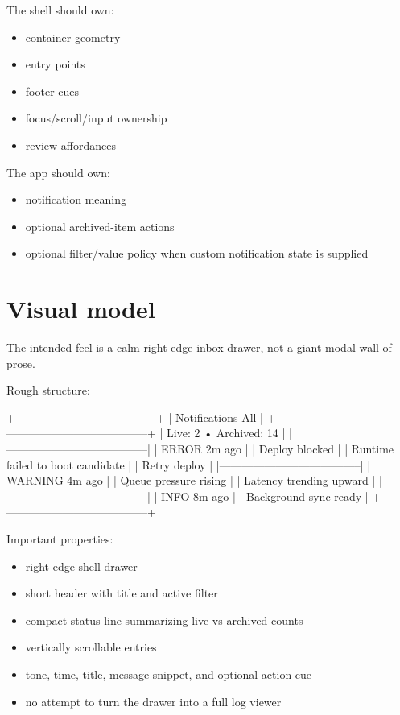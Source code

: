The shell should own:

\begin{itemize}
\tightlist
\item
  container geometry
\item
  entry points
\item
  footer cues
\item
  focus/scroll/input ownership
\item
  review affordances
\end{itemize}

The app should own:

\begin{itemize}
\tightlist
\item
  notification meaning
\item
  optional archived-item actions
\item
  optional filter/value policy when custom notification state is supplied
\end{itemize}

\section{Visual model}\label{record-053-visual-model}

The intended feel is a calm right-edge inbox drawer, not a giant modal wall of prose.

Rough structure:

\begin{CodeBlock}
+--------------------------------------+
| Notifications                   All |
+--------------------------------------+
| Live: 2 • Archived: 14              |
|--------------------------------------|
| ERROR    2m ago                      |
| Deploy blocked                       |
| Runtime failed to boot candidate     |
| Retry deploy                         |
|--------------------------------------|
| WARNING  4m ago                      |
| Queue pressure rising                |
| Latency trending upward              |
|--------------------------------------|
| INFO     8m ago                      |
| Background sync ready                |
+--------------------------------------+
\end{CodeBlock}

Important properties:

\begin{itemize}
\tightlist
\item
  right-edge shell drawer
\item
  short header with title and active filter
\item
  compact status line summarizing live vs archived counts
\item
  vertically scrollable entries
\item
  tone, time, title, message snippet, and optional action cue
\item
  no attempt to turn the drawer into a full log viewer
\end{itemize}

